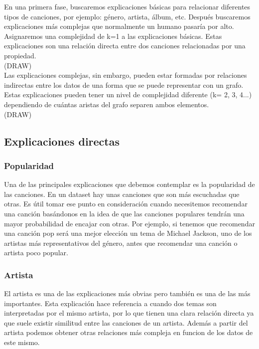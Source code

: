 En una primera fase, buscaremos explicaciones básicas para relacionar diferentes tipos de canciones, por ejemplo: género, artista, álbum, etc. Después buscaremos explicaciones más complejas que normalmente un humano pasaría por alto. Asignaremos una complejidad de k=1 a las explicaciones básicas. Estas explicaciones son una relación directa entre dos canciones relacionadas por una propiedad.\\

(DRAW)\\

Las explicaciones complejas, sin embargo, pueden estar formadas por relaciones indirectas entre los datos de una forma que se puede representar con un grafo. Estas explicaciones pueden tener un nivel de complejidad diferente (k= 2, 3, 4...) dependiendo de cuántas aristas del grafo separen ambos elementos.\\

(DRAW)\\


\subsection{Explicaciones directas}

\subsubsection*{Popularidad}

Una de las principales explicaciones que debemos contemplar es la popularidad de las canciones. En un dataset hay unas canciones que son más escuchadas que otras. Es útil tomar ese punto en consideración cuando necesitemos recomendar una canción basándonos en la idea de que las canciones populares tendrán una mayor probabilidad de encajar con otras. Por ejemplo, si tenemos que recomendar una canción pop será una mejor elección un tema de Michael Jackson, uno de los artistas más representativos del género, antes que recomendar una canción o artista poco popular.

\subsubsection*{Artista}

El artista es una de las explicaciones más obvias pero también es una de las más importantes. Esta explicación hace referencia a cuando dos temas son interpretadas por el mismo artista, por lo que tienen una clara relación directa ya que suele existir similitud entre las canciones de un artista. Además a partir del artista podemos obtener otras relaciones más compleja en funcion de los datos de este mismo.

